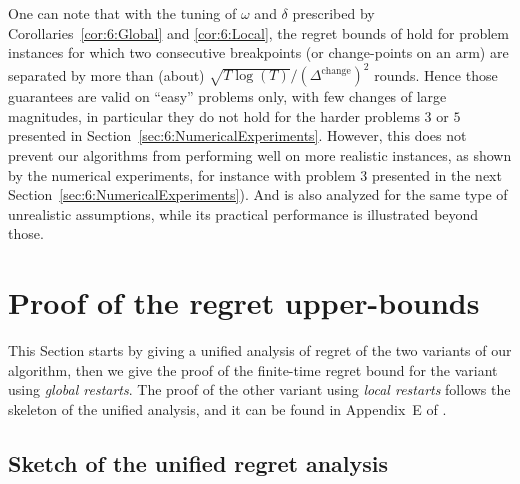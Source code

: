 One can note that with the tuning of $\omega$ and $\delta$ prescribed by Corollaries~\ref{cor:6:Global} and \ref{cor:6:Local}, the regret bounds of \GLRklUCB{} hold for problem instances for which two consecutive breakpoints (or change-points on an arm) are separated by more than (about) $\sqrt{T\log(T)}/(\Delta^{\text{change}})^2$ rounds.
Hence those guarantees are valid on ``easy'' problems only, with few changes of large magnitudes, in particular they do not hold for the harder problems $3$ or $5$ presented in Section~\ref{sec:6:NumericalExperiments}.
%
However, this does not prevent our algorithms from performing well on more realistic instances, as shown by the numerical experiments,
for instance with problem $3$ presented in the next Section~\ref{sec:6:NumericalExperiments}).
%
And \MUCB{} \cite{CaoZhenKvetonXie18} is also analyzed for the same type of unrealistic assumptions, while its practical performance is illustrated beyond those.




\section{Proof of the regret upper-bounds}
\label{sec:6:proofRegret}

This Section starts by giving a unified analysis of regret of the two variants of our algorithm, then we give the proof of the finite-time regret bound for the variant using \emph{global restarts}.
The proof of the other variant using \emph{local restarts} follows the skeleton of the unified analysis, and it can be found in Appendix~E of \cite{Besson2019GLRT}.

\subsection{Sketch of the unified regret analysis}
\label{sub:6:proofSkeleton}

